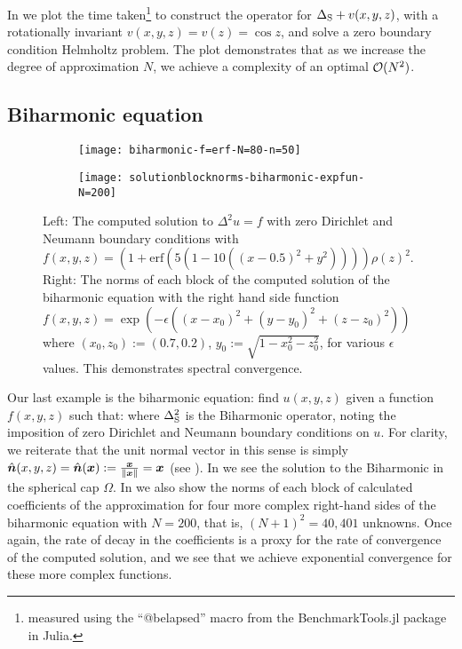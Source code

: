 In  we plot the time taken\footnote{measured using the \enquote{@belapsed} macro from the BenchmarkTools.jl package \cite{BenchmarkTools.jl-2016} in Julia.} to construct the operator for $\Delta_{\rm S} + v(x,y,z)$, with a rotationally invariant $v(x,y,z) = v(z) = \cos z$, and solve a zero boundary condition Helmholtz problem. The plot demonstrates that as we increase the degree of approximation $N$, we achieve a complexity of an optimal $\mathcal{O}(N^2)$.


\subsection{Biharmonic equation}

\begin{figure}[tp]
	\centering
	\begin{subfigure}{0.85\textwidth}
		\texttt{[image: biharmonic-f=erf-N=80-n=50]}
	\end{subfigure}
	\hfill%
	
	\begin{subfigure}{0.55\textwidth}
		\texttt{[image: solutionblocknorms-biharmonic-expfun-N=200]}
	\end{subfigure}
	\hfill%
	\caption{Left: The computed solution to $\Delta^2 u = f$ with zero Dirichlet and Neumann boundary conditions with $f(x,y,z) = (1 + \text{erf}(5(1 - 10((x - 0.5)^2 + y^2)))) \rho(z)^2$. Right: The norms of each block of the computed solution of the biharmonic equation with the right hand side function $f(x,y,z) = \exp(-\epsilon((x-x_0)^2 + (y-y_0)^2 + (z-z_0)^2))$ where  $(x_0, z_0) := (0.7, 0.2)$, $y_0 := \sqrt{1 - x_0^2 - z_0^2}$, for various $\epsilon$ values. This demonstrates spectral convergence.}
	\label{fig:sc:biharmonic}
\end{figure}

Our last example is the biharmonic equation: find $u(x,y,z)$ given a function $f(x,y,z)$ such that:
where $\Delta_{\rm S}^2$ is the Biharmonic operator, noting the imposition of zero Dirichlet and Neumann boundary conditions on $u$. For clarity, we reiterate that the unit normal vector in this sense is simply $\hat{\bm{n}}(x,y,z) = \hat{\bm{n}}(\bm{x}) := {\bm{x} \over \left\| \bm{x} \right\|} = \bm{x}$ (see ). In  we see the solution to the Biharmonic  in the spherical cap $\Omega$. In  we also show the norms of each block of calculated coefficients of the approximation for four more complex right-hand sides of the biharmonic equation with $N = 200$, that is, $(N+1)^2 = 40,401$ unknowns. Once again, the rate of decay in the coefficients is a proxy for the rate of convergence of the computed solution, and we see that we achieve exponential convergence for these more complex functions.


